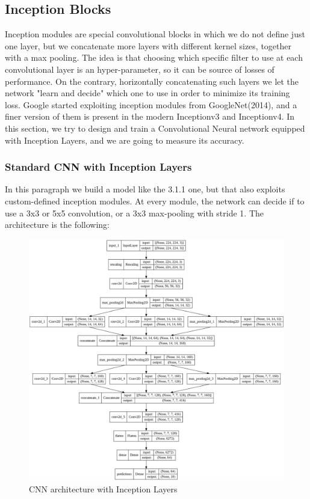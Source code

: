 \subsection{Inception Blocks}
Inception modules are special convolutional blocks in which we do not define just one layer, but we concatenate more layers with different kernel sizes, together with a max pooling. The idea is that choosing which specific filter to use at each convolutional layer is an hyper-parameter, so it can be source of losses of performance. On the contrary, horizontally concatenating such layers we let the network "learn and decide" which one to use in order to minimize its training loss. Google started exploiting inception modules from GoogleNet(2014), and a finer version of them is present in the modern Inceptionv3 and Inceptionv4. In this section, we try to design and train a Convolutional Neural network equipped with Inception Layers, and we are going to measure its accuracy. 

\subsubsection{Standard CNN with Inception Layers}
In this paragraph we build a model like the 3.1.1 one, but that also exploits custom-defined inception modules. At every module, the network can decide if to use a 3x3 or 5x5 convolution, or a 3x3 max-pooling with stride 1.
The architecture is the following:


\begin{figure}[H]
	\centering
	\includegraphics[height=0.8\textwidth]{img/scratch/inception_layers.jpg}
	\caption{CNN architecture with Inception Layers}
	\label{fig:InceptionLayersCNN}
\end{figure}

